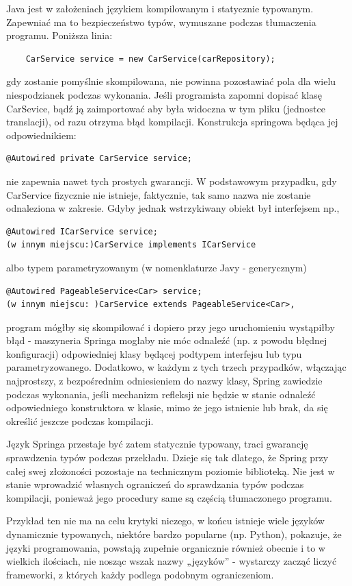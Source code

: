 Java jest w założeniach językiem kompilowanym i statycznie typowanym. Zapewniać ma to bezpieczeństwo typów, wymuszane podczas tłumaczenia programu. Poniższa linia:
\begin{lstlisting}
    CarService service = new CarService(carRepository);
\end{lstlisting}
gdy zostanie pomyślnie skompilowana, nie powinna pozostawiać pola dla wielu niespodzianek podczas wykonania.
Jeśli programista zapomni dopisać klasę CarSevice, bądź ją zaimportować aby była widoczna w tym pliku (jednostce translacji), od razu otrzyma błąd kompilacji.
Konstrukcja springowa będąca jej odpowiednikiem:
\begin{lstlisting}
@Autowired private CarService service;
\end{lstlisting}
nie zapewnia nawet tych prostych gwarancji. W podstawowym przypadku, gdy CarService fizycznie nie istnieje, faktycznie, tak samo nazwa nie zostanie odnaleziona w zakresie. Gdyby jednak wstrzykiwany obiekt był interfejsem np.,
\begin{lstlisting}
@Autowired ICarService service; 
(w innym miejscu:)CarService implements ICarService
\end{lstlisting}
albo typem parametryzowanym (w nomenklaturze Javy - generycznym)
\begin{lstlisting}
@Autowired PageableService<Car> service; 
(w innym miejscu: )CarService extends PageableService<Car>,
\end{lstlisting}
program mógłby się skompilować i dopiero przy jego uruchomieniu wystąpiłby błąd - maszyneria Springa mogłaby nie móc odnaleźć (np. z powodu błędnej konfiguracji) odpowiedniej klasy będącej podtypem interfejsu lub typu parametryzowanego. Dodatkowo, w każdym z tych trzech przypadków, włączając najprostszy, z bezpośrednim odniesieniem do nazwy klasy, Spring zawiedzie podczas wykonania, jeśli mechanizm refleksji nie będzie w stanie odnaleźć odpowiedniego konstruktora w klasie, mimo że jego istnienie lub brak, da się określić jeszcze podczas kompilacji.

Język Springa przestaje być zatem statycznie typowany, traci gwarancję sprawdzenia typów podczas przekładu. Dzieje się tak dlatego, że Spring przy całej swej złożoności pozostaje na technicznym poziomie biblioteką. Nie jest w stanie wprowadzić własnych ograniczeń do sprawdzania typów podczas kompilacji, ponieważ jego procedury same są częścią tłumaczonego programu. 

Przykład ten nie ma na celu krytyki niczego, w końcu istnieje wiele języków dynamicznie typowanych, niektóre bardzo popularne (np. Python), pokazuje,  że języki programowania, powstają zupełnie organicznie również obecnie i to w wielkich ilościach, nie nosząc wszak nazwy „języków” - wystarczy zacząć liczyć frameworki, z których każdy podlega podobnym ograniczeniom.

